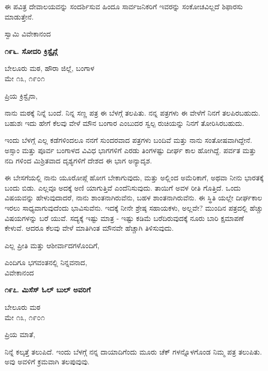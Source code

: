 ಈ ಪವಿತ್ರ ದೇವಾಲಯವನ್ನು ಸಂದರ್ಶಿಸುವ ಹಿಂದೂ ಸಾರ್ವಜನಿಕರಿಗೆ ಇವರನ್ನು ಸಂಕೋಚವಿಲ್ಲದೆ ಶಿಫಾರಸು ಮಾಡುತ್ತೇನೆ.

\begin{flushright}
ಸ್ವಾಮಿ ವಿವೇಕಾನಂದ
\end{flushright}

\begin{center}
\textbf{೧೯೬. ಸೋದರಿ ಕ್ರಿಸ್ಟೈನ್ಗೆ}
\end{center}

\begin{flushright}
ಬೇಲೂರು ಮಠ, ಹೌರಾ ಜಿಲ್ಲೆ, ಬಂಗಾಳ\\ಮೇ ೧೩, ೧೯೦೧
\end{flushright}

ಪ್ರಿಯ ಕ್ರಿಸ್ಟೈನಾ,

ನಾನು ಮಠಕ್ಕೆ ನಿನ್ನೆ ಬಂದೆ. ನಿನ್ನ ಸಣ್ಣ ಪತ್ರ ಈ ಬೆಳಗ್ಗೆ ತಲಪಿತು. ನನ್ನ ಪತ್ರಗಳು ಈ ವೇಳೆಗೆ ನಿನಗೆ ತಲಪಿರಬಹುದು. ಬಹುಶಃ ಇದು ಹೇಗೆ ಕೆಲವು ವೇಳೆ ಮೌನ ಬಂಗಾರ ಎಂಬುದರ ಸ್ವಲ್ಪ ರುಚಿಯನ್ನು ನಿನಗೆ ತೋರಿಸಿರಬಹುದು.

ಇಂದು ಬೆಳಗ್ಗೆ ಎಲ್ಲ ಕಡೆಗಳಿಂದಲೂ ನನಗೆ ಸುಂದರವಾದ ಪತ್ರಗಳು ಬಂದಿವೆ ಮತ್ತು ನಾನು ಸಂತೋಷವಾಗಿದ್ದೇನೆ. ಅಸ್ಸಾಂ ಮತ್ತು ಪೂರ್ವ ಬಂಗಾಳದ ವಿವಿಧ ಭಾಗಗಳಿಗೆ ಎರಡು ತಿಂಗಳಷ್ಟು ದೀರ್ಘ ಕಾಲ ಹೋಗಿದ್ದೆ. ಪರ್ವತ ಮತ್ತು ನದಿ ಗಳಿಂದ ಮಿಶ್ರಿತವಾದ ದೃಶ್ಯಗಳಿಗೆ ದೇಶದ ಈ ಭಾಗ ಅನ್ಯಾದೃಶ.

ಈ ಬೇಸಗೆಯಲ್ಲಿ ನಾನು ಯೂರೋಪ್ಗೆ ಹೋಗ ಬೇಕಾಗುವುದು, ಮತ್ತು ಅಲ್ಲಿಂದ ಅಮೆರಿಕಾಗೆ, ಅಥವಾ ನೀನು ಭಾರತಕ್ಕೆ ಬಂದು ಬಿಡು. ಎಲ್ಲವೂ ಅದಕ್ಕೆ ಅಣಿ ಯಾಗುತ್ತಿವೆ ಎಂದೆನಿಸುವುದು. ತಾಯಿಗೆ ಅವಳ ರೀತಿ ಗೊತ್ತಿದೆ. ಒಂದು ವಿಷಯವನ್ನು ಹೇಳುವುದಾದರೆ, ನಾನು ಶಾಂತನಾಗಿರುವೆನು, ಬಹಳ ಶಾಂತನಾಗಿರುವೆನು. ಈ ಸ್ಥಿತಿ ಯಲ್ಲೇ ದೀರ್ಘಕಾಲ ಇರಲು ಸಾಧ್ಯವಾಗುವುದೆಂದು ಭಾವಿಸುವೆನು. ಇದಕ್ಕೆ ನೀನೇ ಶ್ರೇಷ್ಠ ಸಹಾಯಕಳು, ಅಲ್ಲವೇ? ಮುಂದಿನ ಪತ್ರದಲ್ಲಿ ಹೆಚ್ಚು ವಿಷಯಗಳನ್ನು ಬರೆ ಯುವೆ. ಸದ್ಯಕ್ಕೆ ಇಷ್ಟು ಮಾತ್ರ - ಇಷ್ಟು ಕಡಿಮೆ ಬರೆದಿರುವುದಕ್ಕೆ ನೂರು ಬಾರಿ ಕ್ಷಮಾಪಣೆ ಕೇಳುವೆ. ಆದರೂ ಕೆಲವು ವೇಳೆ ಮಾತಿಗಿಂತ ಮೌನವೇ ಹೆಚ್ಚಾಗಿ ತಿಳಿಸುವುದು.

ಎಲ್ಲ ಪ್ರೀತಿ ಮತ್ತು ಆಶೀರ್ವಾದಗಳೊಂದಿಗೆ,

\begin{flushright}
ಎಂದಿಗೂ ಭಗವಂತನಲ್ಲಿ ನಿನ್ನವನಾದ,\\ವಿವೇಕಾನಂದ
\end{flushright}

\begin{center}
\textbf{೧೯೭. ಮಿಸೆಸ್ ಓಲ್ ಬುಲ್ ಅವರಿಗೆ}
\end{center}

\begin{flushright}
ಬೇಲೂರು ಮಠ\\ಮೇ ೧೩, ೧೯೦೧
\end{flushright}

ಪ್ರಿಯ ಮಾತೆ,

ನಿನ್ನೆ ಕಲ್ಕತ್ತೆ ತಲುಪಿದೆ. ಇಂದು ಬೆಳಗ್ಗೆ ನನ್ನ ದಾಯಾದಿಗೆಂದು ಮೂರು ಚೆಕ್ ಗಳನ್ನೊಳಗೊಂಡ ನಿಮ್ಮ ಪತ್ರ ತಲುಪಿತು. ಅವು ಅವಳಿಗೆ ಕ್ರಮವಾಗಿ ತಲಪುವುವು.

